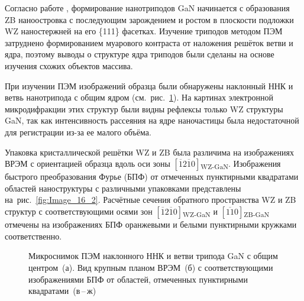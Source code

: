 Согласно работе \cite{Lee2010}, формирование нанотриподов GaN начинается с
образования ZB наноостровка с последующим зарождением и ростом в плоскости
подложки WZ наностержней на его \{111\} фасетках. Изучение триподов методом ПЭМ
затруднено формированием муарового контраста от наложения решёток ветви и ядра,
поэтому выводы о структуре ядра триподов были сделаны на основе изучения схожих
объектов массива.

При изучении ПЭМ изображений образца были обнаружены наклонный ННК и ветвь
нанотрипода с общим ядром (см.~рис.~\cref{fig:Image_16}). На картинах
электронной микродифракции этих структур были видны рефлексы только WZ
структуры GaN, так как интенсивность рассеяния на ядре наночастицы была
недостаточной для регистрации из-за ее малого объёма.

Упаковка кристаллической решётки WZ и ZB была различима на изображениях ВРЭМ с
ориентацией образца вдоль оси зоны
\([\overline{1}2\overline{1}0]\)\textsubscript{WZ-GaN}. Изображения быстрого
преобразования Фурье (БПФ) от отмеченных пунктирными квадратами областей
наноструктуры с различными упаковками представлены
на~рис.~\cref{fig:Image_16_2}. Расчётные сечения обратного пространства WZ и ZB
структур с соответствующими осями зон
\([\overline{1}2\overline{1}0]\)\textsubscript{WZ-GaN} и
\([\overline{11}0]\)\textsubscript{ZB-GaN} отмечены на изображениях БПФ
оранжевыми и белыми пунктирными кружками соответственно.

\begin{figure}[ht] 
				\caption{Микроснимок ПЭМ наклонного ННК и ветви трипода GaN с общим
					центром~(а). Вид крупным планом ВРЭМ~(б) с соответствующими
			изображениями БПФ от областей, отмеченных пунктирными
	квадратами~(в\,--\,ж)}\label{fig:Image_16} \end{figure}

